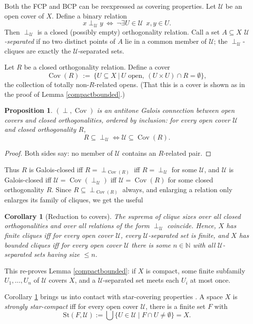 \documentclass[12pt]{article}
\newcommand{\N}{{\mathbb N}}
\newcommand{\Cov}{\operatorname{Cov}}
\newcommand{\U}{{\mathcal U}}
\newcommand{\st}{\mbox{St}}
\theoremstyle{plain}
\newtheorem{corollary}{Corollary}
\newtheorem{proposition}{Proposition}
\theoremstyle{definition}
\theoremstyle{remark}
\begin{document}
Both the FCP and BCP can be reexpressed as covering properties. Let $\U$ be an open cover of $X$. Define a binary relation
\[x \perp_{\U} y \ \Leftrightarrow \ \neg \exists U \in \U \ \ x,y \in U.\]
Then $\perp_{\U}$ is a closed (possibly empty) orthogonality relation. Call a set $A \subseteq X$ {\em $\U$-separated} if no two distinct points of $A$ lie in a common member of $\U$; the $\perp_{\U}$-cliques are exactly the $\U$-separated sets.

Let $R$ be a closed orthogonality relation. Define a cover
\[\Cov(R) \ := \ \{ U \subseteq X \ | \ U \mbox{ open}, \ (U \times U) \cap R = \emptyset\},\]
the collection of totally non-$R$-related opens. (That this is a cover is shown as in the proof of Lemma \ref{compactbounded}.)

\begin{proposition}\label{galois}
$(\perp, \Cov)$ is an antitone Galois connection between open covers and closed orthogonalities, ordered by inclusion: for every open cover $\U$ and closed orthogonality $R$,
\[ R \subseteq \perp_{\U} \iff \U \subseteq \Cov(R). \]
\end{proposition}

\begin{proof}
Both sides say: no member of $\U$ contains an $R$-related pair.
\end{proof}

Thus $R$ is Galois-closed iff $R = \perp_{\Cov(R)}$ iff $R = \perp_{\U}$ for some $\U$, and $\U$ is Galois-closed iff $\U = \Cov(\perp_{\U})$ iff $\U = \Cov(R)$ for some closed orthogonality $R$. Since $R \subseteq \perp_{\Cov(R)}$ always, and enlarging a relation only enlarges its family of cliques, we get the useful

\begin{corollary}[Reduction to covers]\label{covers}
The suprema of clique sizes over all closed orthogonalities and over all relations of the form $\perp_{\U}$ coincide. Hence, $X$ has finite cliques iff for every open cover $\U$, every $\U$-separated set is finite, and $X$ has bounded cliques iff for every open cover $\U$ there is some $n \in \N$ with all $\U$-separated sets having size $\leq n$.  
\end{corollary}

This re-proves Lemma \ref{compactbounded}: if $X$ is compact, some finite subfamily $U_1, \dots, U_n$ of $\U$ covers $X$, and a $\U$-separated set meets each $U_i$ at most once. 


Corollary \ref{covers} brings us into contact 
with star-covering properties \cite{Cao,vDRRT}. 
A space $X$ is {\em strongly star-compact} iff for every open cover ${\mathcal U}$, there is a finite set $F$ with \[\st(F,{\mathcal U}) := \bigcup \{ U \in {\mathcal U} \mid F \cap U \not = \emptyset\} = X.\]
\end{document}

